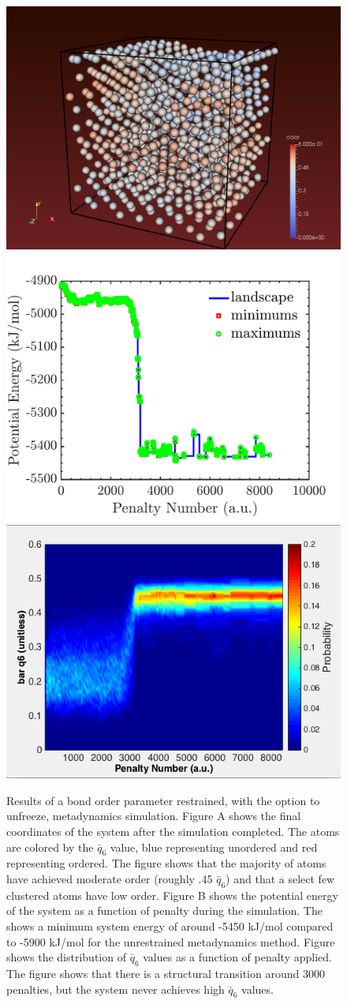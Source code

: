 \begin{figure}[h]
	\centering
	\includegraphics[width = .4\textwidth]{./Figures/Appendix/can_unfreeze.png}
	\hspace{.1\textwidth}
	\includegraphics[width = .4\textwidth]{./Figures/Appendix/unfreeze_landscape.pdf}
	\\
	\vspace{5mm}
	\includegraphics[width = .4\textwidth]{./Figures/Appendix/unfreeze_heatplot.png}
	\caption{Results of a bond order parameter restrained, with the option to unfreeze, metadynamics simulation.  Figure A shows the final coordinates of the system after the simulation completed. The atoms are colored by the $\bar{q}_6$ value, blue representing unordered and red representing ordered.  The figure shows that the majority of atoms have achieved moderate order (roughly .45 $\bar{q}_6$) and that a select few clustered atoms have low order.  Figure B shows the potential energy of the system as a function of penalty during the simulation.  The shows a minimum system energy of around -5450 kJ/mol compared to -5900 kJ/mol for the unrestrained metadynamics method.  Figure shows the distribution of $\bar{q}_6$ values as a function of penalty applied.  The figure shows that there is a structural transition around 3000 penalties, but the system never achieves high $\bar{q}_6$ values. }
	\label{unfreeze_final}
\end{figure}

